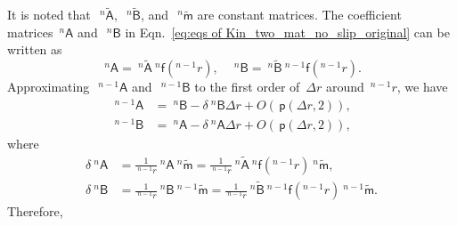 \documentclass[preprint,10pt,times]{elsarticle}
\numberwithin{equation}{section}
\renewcommand{\u}[1]{\boldsymbol{#1}}
\newcommand{\usf}[1]{\u{\mathsf #1}}
\newcommand{\pr}[1]{\left( #1 \right)}
\newcommand{\p}{\,\mathsf{p}}
\renewcommand{\>}{$\Rightarrow$}
\begin{document}
It is noted that~$~^{n}\tilde{\usf{A}}$,~$~^{n}\tilde{\usf{B}}$, and~$~^{n}\tilde{\usf{m}}$ are constant matrices. The coefficient matrices~${}^{n}{\usf{A}}$ and~$~^{n}{\usf{B}}$ in Eqn.~\eqref{eq:eqs of Kin_two_mat_no_slip_original} can be written as
\begin{equation}
	~^{n}{\usf{A}} = ~^{n}\tilde{\usf{A}}  ~^{n}\usf{f}({}^{n-1}\!r), \quad
	~^{n}{\usf{B}} = ~^{n}\tilde{\usf{B}}  ~^{n-1}\usf{f}({}^{n-1}\!r).
\end{equation}
Approximating~$~^{{n-1}}{\usf{A}}$ and~$~^{{n-1}}{\usf{B}}$ to the first order of~$\Delta r$ around~${}^{n-1}\!{r}$, we have
\begin{subequations}
\begin{align}
	~^{{n-1}}{\usf{A}} & = ~^{n}\usf{B} - \delta ~^{n}\usf{B} \Delta r + O(\p\pr{\Delta r,2}), \\
	~^{{n-1}}{\usf{B}} & = ~^{n}\usf{A} - \delta ~^{n}\usf{A} \Delta r + O(\p\pr{\Delta r,2}),
\end{align}
\end{subequations}
where
\begin{subequations}
	\begin{align}
	\delta ~^{n}\usf{A} & = \frac{1}{~^{n-1}\!{r}} ~^{n}\usf{A} ~^{n}\tilde{\usf{m}} = \frac{1}{~^{n-1}\!{r}} ~^{n}\tilde{\usf{A}} ~^{n}\usf{f}({}^{n-1}\!r) ~^{n}\tilde{\usf{m}}, \\
	\delta ~^{n}\usf{B} & = \frac{1}{~^{n-1}\!{r}} ~^{n}\usf{B} ~^{n-1}\tilde{\usf{m}} = \frac{1}{~^{n-1}\!{r}} ~^{n}\tilde{\usf{B}} ~^{n-1}\usf{f}({}^{n-1}\!r) ~^{n-1}\tilde{\usf{m}}.
	\end{align}
\end{subequations}
Therefore,
\end{document}
